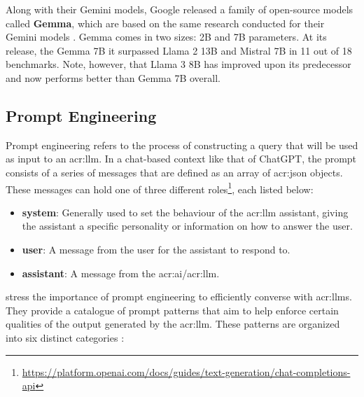 Along with their Gemini models, Google released a family of open-source models called \textbf{Gemma}, which are based on the same research conducted for their Gemini models \citep{gemmateamGemmaOpenModels2024}. Gemma comes in two sizes: 2B and 7B parameters. At its release, the Gemma 7B it surpassed Llama 2 13B and Mistral 7B  in 11 out of 18 benchmarks. Note, however, that Llama 3 8B has improved upon its predecessor and now performs better than Gemma 7B overall.


\subsection{Prompt Engineering}
\label{subsec:prompt-engineering}

Prompt engineering refers to the process of constructing a query that will be used as input to an \acrshort{acr:llm}. In a chat-based context like that of ChatGPT, the prompt consists of a series of messages that are defined as an array of \acrshort{acr:json} objects. These messages can hold one of three different roles\footnote{\url{https://platform.openai.com/docs/guides/text-generation/chat-completions-api}}, each listed below:

\begin{itemize}
    \item \textbf{system}: Generally used to set the behaviour of the \acrshort{acr:llm} assistant, giving the assistant a specific personality or information on how to answer the user.
    \item \textbf{user}: A message from the user for the assistant to respond to.
    \item \textbf{assistant}: A message from the \acrshort{acr:ai}/\acrshort{acr:llm}.
\end{itemize}

\cite{whitePromptPatternCatalog2023a} stress the importance of prompt engineering to efficiently converse with \glspl{acr:llm}. They provide a catalogue of prompt patterns that aim to help enforce certain qualities of the output generated by the \gls{acr:llm}. These patterns are organized into six distinct categories \citep[4]{whitePromptPatternCatalog2023a}:

